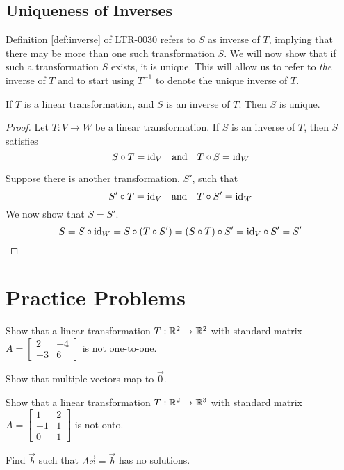 \documentclass{ximera}
\begin{document}
\subsection*{Uniqueness of Inverses}

Definition \ref{def:inverse} of LTR-0030 refers to $S$ as  inverse of $T$, implying that there may be more than one such transformation $S$.  We will now show that if such a transformation $S$ exists, it is unique.  This will allow us to refer to {\it the} inverse of $T$ and to start using $T^{-1}$ to denote the unique inverse of $T$.

\begin{theorem}\label{th:inverseisunique}
If $T$ is a linear transformation, and $S$ is an inverse of $T$.  Then $S$ is unique.
\end{theorem}
\begin{proof}
Let $T:V\rightarrow W$ be a linear transformation.  If $S$ is an inverse of $T$, then $S$ satisfies
$$S\circ T=\text{id}_V\quad \text{and}\quad T\circ S=\text{id}_W$$

Suppose there is another transformation, $S'$, such that 
$$S'\circ T=\text{id}_V\quad \text{and}\quad T\circ S'=\text{id}_W$$
We now show that $S=S'$.
$$S=S\circ \text{id}_W=S\circ(T\circ S')=(S\circ T)\circ S'=\text{id}_V\circ S'=S'$$
\end{proof}

\section*{Practice Problems}
\begin{problem}
Show that a linear transformation $T:\mathbb{R}^2\rightarrow \mathbb{R}^2$ with standard matrix $A=\begin{bmatrix}2&-4\\-3&6\end{bmatrix}$ is not one-to-one.
\begin{hint}
        Show that multiple vectors map to $\vec{0}$.
      \end{hint}
\end{problem}
 
 \begin{problem}
 Show that a linear transformation $T:\mathbb{R}^2\rightarrow \mathbb{R}^3$ with standard matrix $A=\begin{bmatrix}1&2\\-1&1\\0&1\end{bmatrix}$ is not onto.
 \begin{hint}
 Find $\vec{b}$ such that $A\vec{x}=\vec{b}$ has no solutions.
 \end{hint}
 \end{problem}
 
\end{document}
